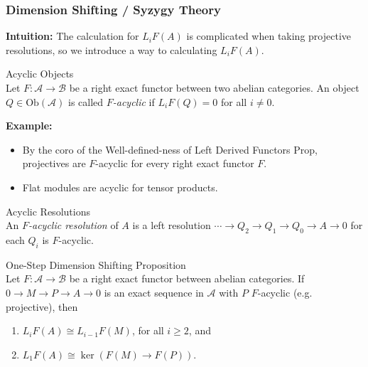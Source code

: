 \subsubsection{Dimension Shifting / Syzygy Theory}

\noindent\textbf{Intuition:} The calculation for $L_iF(A)$ is complicated when taking projective resolutions, so we introduce a way to calculating $L_iF(A)$.

\begin{definition}{Acyclic Objects}\\
Let $F: \mathcal{A}\to \mathcal{B}$ be a right exact functor between two abelian categories. An object $Q\in \text{Ob} (\mathcal{A})$ is called \textit{$F$-acyclic} if $L_i F(Q)=0$ for all $i\neq 0$.
\end{definition}


\noindent\textbf{Example:} \begin{itemize}
    \item By the coro of the Well-defined-ness of Left Derived Functors Prop, projectives are $F$-acyclic for every right exact functor $F$.

    \item Flat modules are acyclic for tensor products.
\end{itemize}

\begin{definition}{Acyclic Resolutions}\\
An \textit{$F$-acyclic resolution} of $A$ is a left resolution $\cdots \to Q_2 \to Q_1\to Q_0 \to A\to0$ for each $Q_i$ is $F$-acyclic.
\end{definition}

\begin{proposition}{One-Step Dimension Shifting Proposition}\\
Let $F: \mathcal{A} \to \mathcal{B}$ be a right exact functor between abelian categories. If $0\to M\to P\to A\to0$ is an exact sequence in $\mathcal{A}$ with $P$ $F$-acyclic (e.g. projective), then
\begin{enumerate}
    \item $L_iF(A) \cong L_{i-1}F(M)$, for all $i\geq 2$, and
    \item $L_1F(A) \cong \ker (F(M) \to F(P))$.
\end{enumerate}
\end{proposition}

